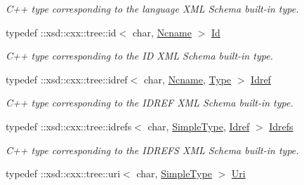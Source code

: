 \begin{DoxyCompactItemize}
\begin{DoxyCompactList}\small\item\em C++ type corresponding to the language XML Schema built-\/in type. \item\end{DoxyCompactList}\item 
\hypertarget{namespacexml__schema_a14dae7debe509f1d905ac7ab650d8c3f}{
typedef ::xsd::cxx::tree::id$<$ char, \hyperlink{namespacexml__schema_aceb9a08fa292b3b3af49f5aa42d06fa9}{Ncname} $>$ \hyperlink{namespacexml__schema_a14dae7debe509f1d905ac7ab650d8c3f}{Id}}
\label{namespacexml__schema_a14dae7debe509f1d905ac7ab650d8c3f}

\begin{DoxyCompactList}\small\item\em C++ type corresponding to the ID XML Schema built-\/in type. \item\end{DoxyCompactList}\item 
\hypertarget{namespacexml__schema_aec599d3d2c37850cde794950fa8bc1fd}{
typedef ::xsd::cxx::tree::idref$<$ char, \hyperlink{namespacexml__schema_aceb9a08fa292b3b3af49f5aa42d06fa9}{Ncname}, \hyperlink{namespacexml__schema_ad34e8fd175bf4f9fece6c670b01aa239}{Type} $>$ \hyperlink{namespacexml__schema_aec599d3d2c37850cde794950fa8bc1fd}{Idref}}
\label{namespacexml__schema_aec599d3d2c37850cde794950fa8bc1fd}

\begin{DoxyCompactList}\small\item\em C++ type corresponding to the IDREF XML Schema built-\/in type. \item\end{DoxyCompactList}\item 
\hypertarget{namespacexml__schema_afba3950a30b3d8279e02e9657a2637ab}{
typedef ::xsd::cxx::tree::idrefs$<$ char, \hyperlink{namespacexml__schema_a1171be9b6e593e49b895a46671f5dc5f}{SimpleType}, \hyperlink{namespacexml__schema_aec599d3d2c37850cde794950fa8bc1fd}{Idref} $>$ \hyperlink{namespacexml__schema_afba3950a30b3d8279e02e9657a2637ab}{Idrefs}}
\label{namespacexml__schema_afba3950a30b3d8279e02e9657a2637ab}

\begin{DoxyCompactList}\small\item\em C++ type corresponding to the IDREFS XML Schema built-\/in type. \item\end{DoxyCompactList}\item 
\hypertarget{namespacexml__schema_ae14d61a2e71e44fa4b46c9492c59b44d}{
typedef ::xsd::cxx::tree::uri$<$ char, \hyperlink{namespacexml__schema_a1171be9b6e593e49b895a46671f5dc5f}{SimpleType} $>$ \hyperlink{namespacexml__schema_ae14d61a2e71e44fa4b46c9492c59b44d}{Uri}}
\label{namespacexml__schema_ae14d61a2e71e44fa4b46c9492c59b44d}


\end{DoxyCompactItemize}
